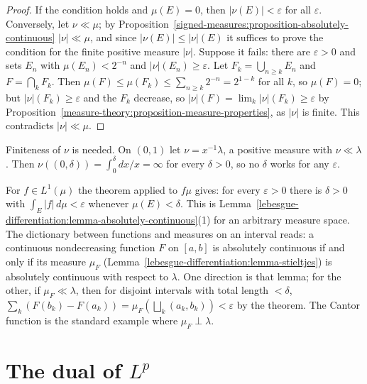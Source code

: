 \begin{proof}
If the condition holds and $\mu(E) = 0$, then $|\nu(E)| < \varepsilon$ for all $\varepsilon$. Conversely, let $\nu \ll \mu$; by Proposition~\ref{signed-measures:proposition-absolutely-continuous}
$|\nu| \ll \mu$, and since $|\nu(E)| \leq |\nu|(E)$ it suffices to prove the condition for the finite positive measure $|\nu|$. Suppose it fails: there are $\varepsilon > 0$ and sets $E_n$ with
$\mu(E_n) < 2^{-n}$ and $|\nu|(E_n) \geq \varepsilon$. Let $F_k = \bigcup_{n \geq k}E_n$ and $F = \bigcap_kF_k$. Then $\mu(F) \leq \mu(F_k) \leq \sum_{n \geq k}2^{-n} = 2^{1-k}$ for all $k$, so
$\mu(F) = 0$; but $|\nu|(F_k) \geq \varepsilon$ and the $F_k$ decrease, so $|\nu|(F) = \lim_k|\nu|(F_k) \geq \varepsilon$ by Proposition~\ref{measure-theory:proposition-measure-properties}, as
$|\nu|$ is finite. This contradicts $|\nu| \ll \mu$.
\end{proof}

\begin{counterexample}\label{signed-measures:counterexample-epsilon-delta}
Finiteness of $\nu$ is needed. On $(0, 1)$ let $\nu = x^{-1}\lambda$, a positive measure with $\nu \ll \lambda$. Then $\nu((0, \delta)) = \int_0^\delta dx/x = \infty$ for every $\delta > 0$, so no
$\delta$ works for any $\varepsilon$.
\end{counterexample}

\begin{remark}\label{signed-measures:remark-functions-measures}
For $f \in L^1(\mu)$ the theorem applied to $f\mu$ gives: for every $\varepsilon > 0$ there is $\delta > 0$ with $\int_E|f|\,d\mu < \varepsilon$ whenever $\mu(E) < \delta$. This is
Lemma~\ref{lebesgue-differentiation:lemma-absolutely-continuous}(1) for an arbitrary measure space. The dictionary between functions and measures on an interval reads: a continuous nondecreasing
function $F$ on $[a, b]$ is absolutely continuous if and only if its measure $\mu_F$ (Lemma~\ref{lebesgue-differentiation:lemma-stieltjes}) is absolutely continuous with respect to $\lambda$. One
direction is that lemma; for the other, if $\mu_F \ll \lambda$, then for disjoint intervals with total length $< \delta$, $\sum_k(F(b_k) - F(a_k)) = \mu_F(\bigsqcup_k(a_k, b_k)) < \varepsilon$ by the
theorem. The Cantor function is the standard example where $\mu_F \perp \lambda$.
\end{remark}

\section{The dual of $L^p$}\label{signed-measures:section-duality}

